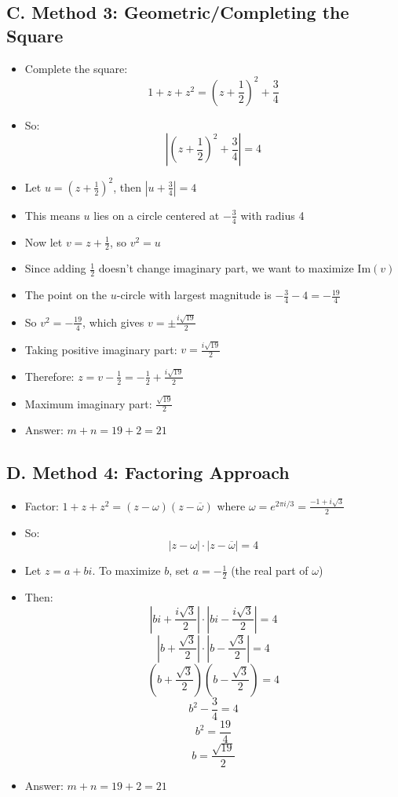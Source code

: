 \documentclass[11pt]{article}
\begin{document}
\begin{conversionbox}
\subsection*{C. Method 3: Geometric/Completing the Square}
\begin{itemize}[leftmargin=*]
    \item Complete the square:
    \[1 + z + z^2 = (z + \frac{1}{2})^2 + \frac{3}{4}\]
    \item So:
    \[\left|(z + \frac{1}{2})^2 + \frac{3}{4}\right| = 4\]
    \item Let $u = (z + \frac{1}{2})^2$, then $|u + \frac{3}{4}| = 4$
    \item This means $u$ lies on a circle centered at $-\frac{3}{4}$ with radius 4
    \item Now let $v = z + \frac{1}{2}$, so $v^2 = u$
    \item Since adding $\frac{1}{2}$ doesn't change imaginary part, we want to maximize $\text{Im}(v)$
    \item The point on the $u$-circle with largest magnitude is $-\frac{3}{4} - 4 = -\frac{19}{4}$
    \item So $v^2 = -\frac{19}{4}$, which gives $v = \pm \frac{i\sqrt{19}}{2}$
    \item Taking positive imaginary part: $v = \frac{i\sqrt{19}}{2}$
    \item Therefore: $z = v - \frac{1}{2} = -\frac{1}{2} + \frac{i\sqrt{19}}{2}$
    \item Maximum imaginary part: $\frac{\sqrt{19}}{2}$
    \item Answer: $m + n = 19 + 2 = 21$
\end{itemize}

\subsection*{D. Method 4: Factoring Approach}
\begin{itemize}[leftmargin=*]
    \item Factor: $1 + z + z^2 = (z - \omega)(z - \overline{\omega})$ where $\omega = e^{2\pi i/3} = \frac{-1 + i\sqrt{3}}{2}$
    \item So:
    \[\left|z - \omega\right| \cdot \left|z - \overline{\omega}\right| = 4\]
    \item Let $z = a + bi$. To maximize $b$, set $a = -\frac{1}{2}$ (the real part of $\omega$)
    \item Then:
    \[\left|bi + \frac{i\sqrt{3}}{2}\right| \cdot \left|bi - \frac{i\sqrt{3}}{2}\right| = 4\]
    \[\left|b + \frac{\sqrt{3}}{2}\right| \cdot \left|b - \frac{\sqrt{3}}{2}\right| = 4\]
    \[\left(b + \frac{\sqrt{3}}{2}\right)\left(b - \frac{\sqrt{3}}{2}\right) = 4\]
    \[b^2 - \frac{3}{4} = 4\]
    \[b^2 = \frac{19}{4}\]
    \[b = \frac{\sqrt{19}}{2}\]
    \item Answer: $m + n = 19 + 2 = 21$
\end{itemize}
\end{conversionbox}
\end{document}
